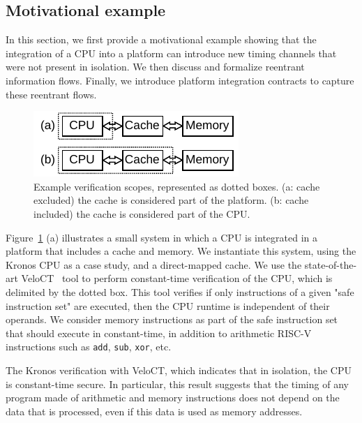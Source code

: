 \subsection{Motivational example}

In this section, we first provide a motivational example showing that the integration of a CPU into a platform can introduce new timing channels that were not present in isolation.
We then discuss and formalize reentrant information flows.
Finally, we introduce platform integration contracts to capture these reentrant flows.

\begin{figure}[t]
    \begin{center}
    \includegraphics[width=0.6\columnwidth]{figures/verifscopecache/verifscopecache.pdf}
    \end{center}
    \vspace*{-1em}
    \caption{\label{fig:verifscopecache}
        Example verification scopes, represented as dotted boxes. (a: cache excluded) the cache is considered part of the platform. (b: cache included) the cache is considered part of the CPU.
    }
    \vspace*{-1em}
\end{figure}


Figure~\ref{fig:verifscopecache} (a) illustrates a small system in which a CPU is integrated in a platform that includes a cache and memory.
We instantiate this system, using the Kronos CPU as a case study, and a direct-mapped cache.
We use the state-of-the-art VeloCT~\cite{dinesh2025h} tool to perform constant-time verification of the CPU, which is delimited by the dotted box.
This tool verifies if only instructions of a given "safe instruction set" are executed, then the CPU runtime is independent of their operands.
We consider memory instructions as part of the safe instruction set that should execute in constant-time, in addition to arithmetic RISC-V instructions such as \texttt{add}, \texttt{sub}, \texttt{xor}, etc.

The Kronos verification with VeloCT, which indicates that in isolation, the CPU is constant-time secure.
In particular, this result suggests that the timing of any program made of arithmetic and memory instructions does not depend on the data that is processed, even if this data is used as memory addresses.

